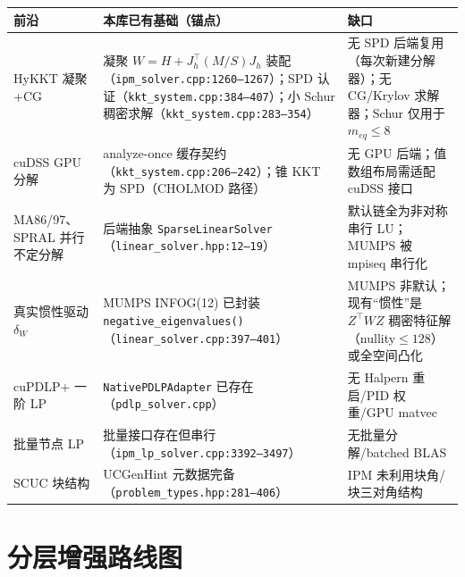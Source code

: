 \documentclass[11pt,a4paper]{ctexart}
\newcommand{\file}[1]{\texttt{#1}}
\newcommand{\func}[1]{\texttt{#1}}
\begin{document}
\begin{center}\footnotesize
\begin{longtable}{@{}p{3.4cm}p{5.2cm}p{5.2cm}@{}}
\toprule
前沿 & 本库已有基础（锚点） & 缺口 \\
\midrule
\endhead
HyKKT 凝聚+CG & 凝聚 $W=H+J_h^{\top}(M/S)J_h$ 装配（\file{ipm\_solver.cpp:1260--1267}）；SPD 认证（\file{kkt\_system.cpp:384--407}）；小 Schur 稠密求解（\file{kkt\_system.cpp:283--354}） & 无 SPD 后端复用（每次新建分解器）；无 CG/Krylov 求解器；Schur 仅用于 $m_{eq}\le 8$ \\
cuDSS GPU 分解 & analyze-once 缓存契约（\file{kkt\_system.cpp:206--242}）；锥 KKT 为 SPD（CHOLMOD 路径） & 无 GPU 后端；值数组布局需适配 cuDSS 接口 \\
MA86/97、SPRAL 并行不定分解 & 后端抽象 \func{SparseLinearSolver}（\file{linear\_solver.hpp:12--19}） & 默认链全为非对称串行 LU；MUMPS 被 mpiseq 串行化 \\
真实惯性驱动 $\delta_W$ & MUMPS INFOG(12) 已封装 \func{negative\_eigenvalues()}（\file{linear\_solver.cpp:397--401}） & MUMPS 非默认；现有``惯性''是 $Z^{\top}WZ$ 稠密特征解（nullity$\le 128$）或全空间凸化 \\
cuPDLP+ 一阶 LP & \func{NativePDLPAdapter} 已存在（\file{pdlp\_solver.cpp}） & 无 Halpern 重启/PID 权重/GPU matvec \\
批量节点 LP & 批量接口存在但串行（\file{ipm\_lp\_solver.cpp:3392--3497}） & 无批量分解/batched BLAS \\
SCUC 块结构 & UCGenHint 元数据完备（\file{problem\_types.hpp:281--406}） & IPM 未利用块角/块三对角结构 \\
\bottomrule
\end{longtable}
\end{center}

\section{分层增强路线图}
\end{document}
